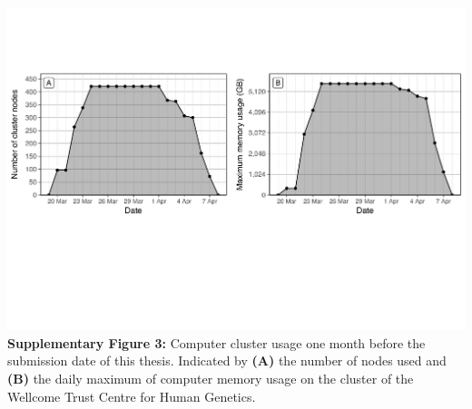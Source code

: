 \documentclass[a4paper,twoside]{dphilthesis}
\begin{document}
\vspace*{2ex}

\begin{flushleft}
\includegraphics[width=\textwidth]{./img/stat_clusterload}
\vspace*{-5ex}
\small\singlespacing\textbf{Supplementary Figure 3:} Computer cluster usage one month before the submission date of this thesis. Indicated by \textbf{(A)} the number of nodes used and \textbf{(B)} the daily maximum of computer memory usage on the cluster of the Wellcome Trust Centre for Human Genetics.
\end{flushleft}


\clearpage
\thispagestyle{empty}
\end{document}
